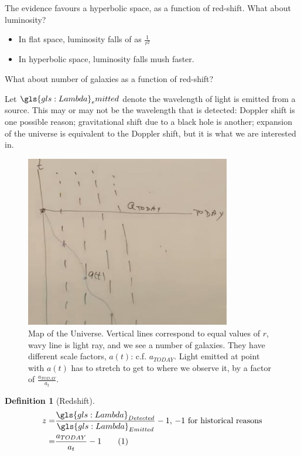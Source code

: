 \documentclass[]{article}
\newcommand\numberthis{\addtocounter{equation}{1}\tag{\theequation}}
\newtheorem{defn}[thm]{Definition}
\begin{document}
The evidence favours a hyperbolic space, as a function of red-shift. What about luminosity?
\begin{itemize}
	\item In flat space, luminosity falls of as $\frac{1}{r^2}$
	\item In hyperbolic space, luminosity falls mush faster.
\end{itemize}

What about number of galaxies as a function of red-shift?

Let $\gls{gls:Lambda}_{e}mitted$ denote the wavelength of light is emitted from a source. This may or may not be the wavelength that is detected: Doppler shift is one possible reason; gravitational shift due to a black hole is another; expansion of the universe is equivalent to the Doppler shift, but it is what we are interested in.

\begin{figure}[H]
	\caption[Map of the Universe]{Map of the Universe. Vertical lines correspond to equal values of $r$, wavy line is light ray, and we see a number of galaxies. They have different  scale factors, $a(t)$: c.f. $a_{TODAY}$. Light emitted at point with $a(t)$ has to stretch to get to where we observe it, by a factor of $\frac{a_{TODAY}}{a_t}$.}
	\includegraphics[width=0.8\textwidth]{cosmo-6-map-universe}  
\end{figure} 

\begin{defn}[Redshift]
	\begin{align*}
		z =& \frac{\gls{gls:Lambda}_{Detected}}{\gls{gls:Lambda}_{Emitted}}-1 \text{, $-1$ for historical reasons}\\ 
		=&\frac{a_{TODAY}}{a_t} - 1 \numberthis \label{eq:z:a}
	\end{align*}
\end{defn}
\end{document}
